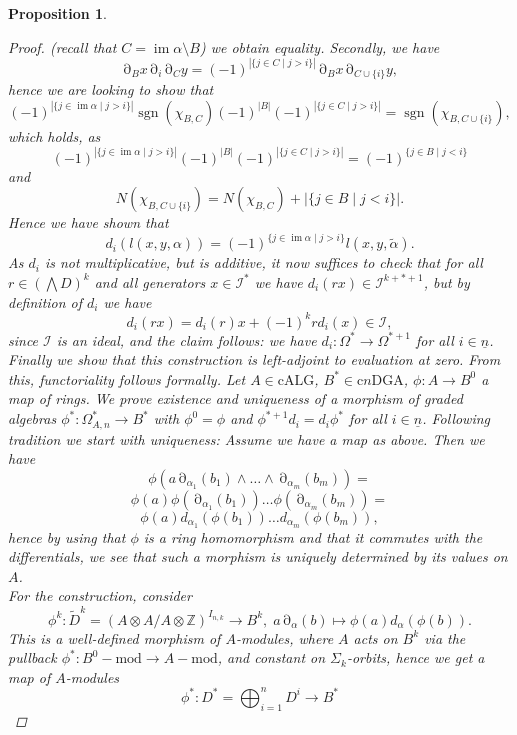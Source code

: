 \documentclass[10pt, a4paper, UKenglish]{article}
\numberwithin{equation}{section}
\newcommand{\bZ}{\mathbb{Z}}
\newcommand{\abs}[1]{\left\vert#1\right\vert}	%
\newcommand{\with}{\mid}  %
\newcommand{\ind}[1]{\underline{#1}}
\newcommand{\n}{\ind{n}}
\newcommand{\sgn}{\operatorname{sgn}}
\newcommand{\im}{\operatorname{im}}
\newcommand{\cndga}{\mathrm{c}n\mathrm{DGA}}
\newcommand{\calg}{\mathrm{cALG}}
\theoremstyle{plain}
\newtheorem{prop}[equation]{Proposition}
\theoremstyle{definition}
\renewcommand{\to}{\longrightarrow}
\renewcommand{\mapsto}{\longmapsto}
\newcommand{\del}{\operatorname{\partial}}
\begin{document}
\begin{prop}
\begin{proof}
(recall that $C = \im \alpha \setminus B$) we obtain equality. Secondly, we have%
    \[\del_B x \del_i \del_C y = (-1)^{ \abs{ \{j \in C \with j > i\} } }%
    \del_B x \del_{ C \cup \{i\} } y, \]
hence we are looking to show that%
    \[ (-1)^{\abs{\{ j \in \im \alpha \with j > i \}} } \sgn(\chi_{B,C})%
    (-1)^{\abs{B}} (-1)^{ \abs{ \{j \in C \with j > i\} } } = %
    \sgn( \chi_{ B, C \cup \{i\} } ), \]
which holds, as%
    \[ (-1)^{\abs{\{ j \in \im \alpha \with j > i \}} } %
    (-1)^{\abs{B}} (-1)^{ \abs{ \{j \in C \with j > i\} } } =%
    (-1)^{ \{ j \in B \with j < i \} } \]%
and%
    \[ N(\chi_{ B, C \cup \{i\} }) = N(\chi_{B,C}) + %
    \abs{ \{j \in B \with j < i\} }. \]
Hence we have shown that%
    \[ d_i ( l(x,y,\alpha) ) = (-1)^{ \{j \in \im \alpha \with j > i \} }%
    l(x,y,\tilde \alpha). \]
As $d_i$ is not multiplicative, but is additive, it now suffices to check that for all $r \in (\bigwedge D)^k$ and all generators $x \in \mathcal{I}^*$ we have $d_i(rx) \in \mathcal{I}^{k+*+1}$, but by definition of $d_i$ we have%
    \[ d_i(rx) = d_i(r) x + (-1)^k r d_i(x) \in \mathcal{I}, \]
since $\mathcal{I}$ is an ideal, and the claim follows: we have $d_i:\Omega^* \to \Omega^{*+1}$ for all $i \in \n$.\\
Finally we show that this construction is left-adjoint to evaluation at zero. From this, functoriality follows formally. Let $A \in \calg$, $B^* \in \cndga$, $\phi: A \to B^0$ a map of rings. We prove existence and uniqueness of a morphism of graded algebras $\phi^*: \Omega^*_{A,n} \to B^*$ with $\phi^0 = \phi$ and $\phi^{*+1} d_i = d_i \phi^*$ for all $i \in \n$. Following tradition we start with uniqueness: Assume we have a map as above. Then we have
    \[ \phi(a \del_{\alpha_1} (b_1) \wedge \ldots \wedge \del_{\alpha_m} (b_m)) = \]
    \[ \phi(a) \phi (\del_{\alpha_1} (b_1)) \ldots \phi(\del_{\alpha_m} (b_m)) = \]
    \[ \phi(a) d_{\alpha_1} (\phi(b_1)) \ldots d_{\alpha_m} (\phi(b_m)), \]
hence by using that $\phi$ is a ring homomorphism and that it commutes with the differentials, we see that such a morphism is uniquely determined by its values on $A$.\\ For the construction, consider%
    \[ \phi^k: \tilde D^k = (A \otimes A / A \otimes \bZ)^{I_{n,k}} %
    \to B^k, \; a \del_\alpha (b) \mapsto %
    \phi(a) d_\alpha (\phi(b)). \]
This is a well-defined morphism of $A$-modules, where $A$ acts on $B^k$ via the pullback $\phi^*:B^0-\mathrm{mod} \to A-\mathrm{mod}$, and constant on $\Sigma_k$-orbits, hence we get a map of $A$-modules%
    \[ \phi^*: D^* = \bigoplus_{i=1}^n D^i \to B^* \]

\end{proof}
\end{prop}
\end{document}
